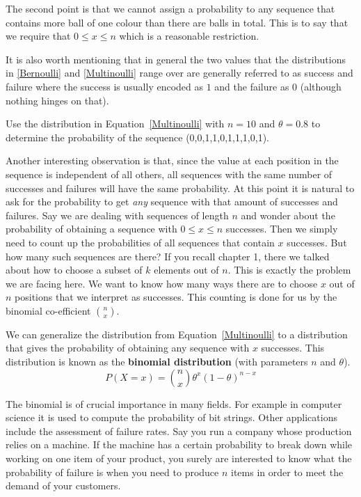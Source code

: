 \documentclass[a4paper,11pt,leqno]{report}
\begin{document}
The second point is that we cannot assign a probability to any sequence that contains more ball of one colour than there are balls in total.
This is to say that we require that $ 0 \leq x \leq n $ which is a reasonable restriction. 

It is also worth mentioning that in general the two values that the distributions in \ref{Bernoulli} and \ref{Multinoulli} range
over are generally referred to as success and failure where the success is usually encoded as $ 1 $ and the failure as $ 0 $
(although nothing hinges on that). 

\begin{Exercise}
Use the distribution in Equation~\eqref{Multinoulli} with $ n = 10 $ and $ \theta = 0.8 $ to determine the probability of the sequence (0,0,1,1,0,1,1,1,0,1).
\end{Exercise}

Another interesting observation is that, since the value at each position in the sequence is independent of all others, all sequences with the same
number of successes and failures will have the same probability. At this point it is natural to ask for the probability to get \textit{any}
sequence with that amount of successes and failures. Say we are dealing with sequences of length $ n $ and wonder about the probability of 
obtaining a sequence with $ 0 \leq x \leq n $ successes. Then we simply need to count up the probabilities of all sequences that contain $ x $ 
successes. But how many such sequences are there? If you recall chapter 1, there we talked about how to choose a subset of $ k $ elements
out of $ n $. This is exactly the problem we are facing here. We want to know how many ways there are to choose $ x $ out of $ n $ positions
that we interpret as successes. This counting is done for us by the binomial co-efficient $ \binom{n}{x} $.

We can generalize the distribution from Equation~\eqref{Multinoulli} to a distribution that gives the probability of obtaining any sequence
with $ x $ successes. This distribution is known as the \textbf{binomial distribution} (with parameters $ n $ and $ \theta $).
\begin{equation}
P(X=x) = \binom{n}{x} \theta^{x} (1-\theta)^{n-x}
\end{equation}

The binomial is of crucial importance in many fields. For example in computer science it is used to compute the probability of bit strings.
Other applications include the assessment of failure rates. Say you run a company whose production relies on a machine. If the machine
has a certain probability to break down while working on one item of your product, you surely are interested to know what the probability
of failure is when you need to produce $ n $ items in order to meet the demand of your customers.
\end{document}
